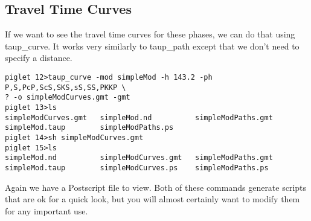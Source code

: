 \subsection{Travel Time Curves}

If we want to see the travel time curves for these phases, we can do that using
taup\_curve. It works very similarly to taup\_path except that we don't need to
specify a distance.

\begin{verbatim}
piglet 12>taup_curve -mod simpleMod -h 143.2 -ph P,S,PcP,ScS,SKS,sS,SS,PKKP \
? -o simpleModCurves.gmt -gmt
piglet 13>ls
simpleModCurves.gmt   simpleMod.nd          simpleModPaths.gmt
simpleMod.taup        simpleModPaths.ps
piglet 14>sh simpleModCurves.gmt
piglet 15>ls
simpleMod.nd          simpleModCurves.gmt   simpleModPaths.gmt
simpleMod.taup        simpleModCurves.ps    simpleModPaths.ps
\end{verbatim}

Again we have a Postscript file to view. Both of these commands generate scripts
that are ok for a quick look, but you will almost certainly want to modify
them for any important use.
